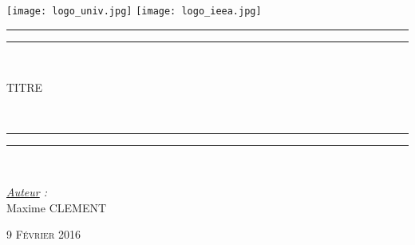 \thispagestyle{cover}

\texttt{[image: logo\_univ.jpg]}
 \hfill \texttt{[image: logo\_ieea.jpg]} \\

\vspace*{10mm}

\begin{center}

	\vspace*{10mm}


	\rule[0.5ex]{\linewidth}{2pt}\vspace*{-\baselineskip}\vspace*{3.2pt}




	\rule[0.5ex]{\linewidth}{1pt}\\[\baselineskip]

		\begin{Huge}TITRE \end{Huge}\\[4mm]

	\rule[0.5ex]{\linewidth}{1pt}\vspace*{-\baselineskip}\vspace{3.2pt}
	\rule[0.5ex]{\linewidth}{2pt}\\

	\vspace*{20mm}

	{\LARGE \textit{\underline{Auteur} :}}\\
	\vspace*{3mm}
	{\LARGE Maxime CLEMENT}\\
	
	\vspace*{20mm}
	
	{\LARGE\textsc{9 Février 2016}}
	
\end{center}
